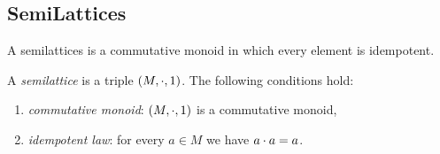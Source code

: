 \documentclass[dvipdfmx,autodetect-engine]{jsarticle}
\begin{document}
\subsection{SemiLattices}
%
A semilattices is a commutative monoid in which every element is idempotent. 
%
\begin{definition}[semilattice]
A {\it semilattice} is a triple $(M,\mathbin{\cdot},\mbox{\boldmath{1}}) $.
The following conditions hold:
%
\begin{enumerate} 
\item {\em commutative monoid}:  $(M,\mathbin{\cdot},\mbox{\boldmath{1}})$ is a commutative monoid,
\item {\em idempotent law}:  for every $a \in M$  we have $a \mathbin{\cdot} a = a$.
\end{enumerate}
\end{definition}
\end{document}
